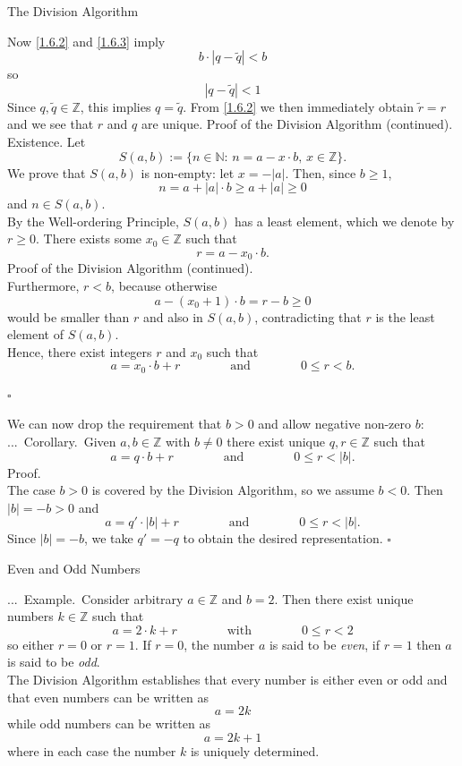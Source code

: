 \documentclass[smaller,hyperref={CJKbookmarks=true}]{beamer}
\newcommand{\N}{\mathbb{N}} \newcommand{\Z}{\mathbb{Z}} \newcommand{\Q}{\mathbb{Q}}
\newenvironment{PROOF}{{\noindent\!\sf\alert{Proof.}}\\}{\hfill$\square$\\}
\newcounter{zhuo}[subsection]
\renewcommand{\thezhuo}{\thesection.\thesubsection.\arabic{zhuo}}
\newenvironment{EXAMPLE}{\stepcounter{zhuo}\alert{\!\thezhuo.~Example.\,}}{}
\newenvironment{COROLLARY}{\stepcounter{zhuo}\alert{\thezhuo.~Corollary.\,}}{}
\begin{document}
\begin{frame}{The Division Algorithm}
\begin{spacing}{1.15}
Now \eqref{1.6.2} and \eqref{1.6.3} imply
\[b\cdot|q-\widetilde{q}|<b\]
so
\[|q-\widetilde{q}|<1\]
Since $q,\widetilde{q}\in\Z$, this implies $q=\widetilde{q}$. From \eqref{1.6.2} we then immediately obtain $\widetilde{r}=r$ and we see that $r$ and $q$ are unique.
\newpage
\alert{Proof of the Division Algorithm (continued).}\\
\alert{Existence.} Let
\[S(a,b):=\{n\in\N\!:\,n=a-x\cdot b,\,x\in\Z\}.\]
We prove that $S(a,b)$ is non-empty: let $x=-|a|$. Then, since $b\geq1$,
\[n=a+|a|\cdot b\geq a+|a|\geq0\]
and $n\in S(a,b)$.\\[5pt]
By the Well-ordering Principle, $S(a,b)$ has a least element, which we denote by $r\geq0$. There exists some $x_0\in\Z$ such that
\[r=a-x_0\cdot b.\]
\newpage
\alert{Proof of the Division Algorithm (continued).}\\
Furthermore, $r<b$, because otherwise
\[a-(x_0+1)\cdot b=r-b\geq0\]
would be smaller than $r$ and also in $S(a,b)$, contradicting that $r$ is the least element of $S(a,b)$.\\[5pt]
Hence, there exist integers $r$ and $x_0$ such that
\[a=x_0\cdot b+r\qquad\qquad
\text{and}\qquad\qquad0\leq r<b.\]
\begin{flushright}
  $\square$
\end{flushright}
\newpage
We can now drop the requirement that $b>0$ and allow negative non-zero $b$:\\
\begin{COROLLARY}
Given $a,b\in\Z$ with $b\neq0$ there exist unique $q,r\in\Z$ such that
\[a=q\cdot b+r\qquad\qquad
\text{and}\qquad\qquad0\leq r<|b|.\]
\end{COROLLARY}
\begin{PROOF}
The case $b>0$ is covered by the Division Algorithm, so we assume $b<0$. Then $|b|=-b>0$ and
\[a=q'\cdot|b|+r\qquad\qquad
\text{and}\qquad\qquad0\leq r<|b|.\]
Since $|b|=-b$, we take $q'=-q$ to obtain the desired representation.
\end{PROOF}
\end{spacing}
\end{frame}
\begin{frame}[t]{Even and Odd Numbers}
\begin{spacing}{1.05}
\begin{EXAMPLE}
Consider arbitrary $a\in\Z$ and $b=2$. Then there exist unique numbers $k\in\Z$ such that
\begin{equation*}
  a=2\cdot k+r\qquad\qquad
  \text{with}\qquad\qquad
  0\leq r<2
\end{equation*}
so either $r=0$ or $r=1$. If $r=0$, the number $a$ is said to be \emph{even}, if $r=1$ then $a$ is said to be \emph{odd}.\\[5pt]
The Division Algorithm establishes that every number is either even or odd
and that even numbers can be written as
\[a=2k\]
while odd numbers can be written as
\[a=2k+1\]
where in each case the number $k$ is uniquely determined.
\end{EXAMPLE}
\end{spacing}
\end{frame}
\end{document}
